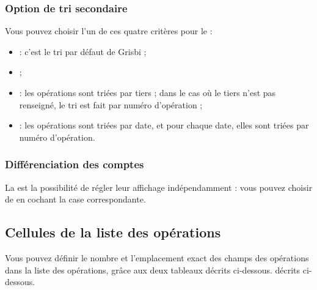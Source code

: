 \subsubsection{Option de tri secondaire}

Vous pouvez choisir l'un de ces quatre critères pour le  :

\begin{itemize}
	\item {} : c'est le tri par défaut de Grisbi ;
	\item {} ;
	\item {} : les opérations sont triées par tiers ; dans le cas où le tiers n'est pas renseigné, le tri est fait par numéro d'opération ;
	\item {} : les opérations sont triées par date, et pour chaque date, elles sont triées par numéro d'opération.
\end{itemize}


\subsubsection{Différenciation des comptes\label{setup-operations-list-differenciation}}

La 
 est la possibilité de régler leur affichage indépendamment : vous pouvez choisir de  en cochant la case correspondante.


\subsection{Cellules de la liste des opérations\label{setup-operations-cells}}

Vous pouvez définir le nombre et l'emplacement exact des champs des opérations dans la liste des opérations, grâce aux deux tableaux 
\ifIllustration décrits ci-dessous.
\else décrits ci-dessous.
\fi

